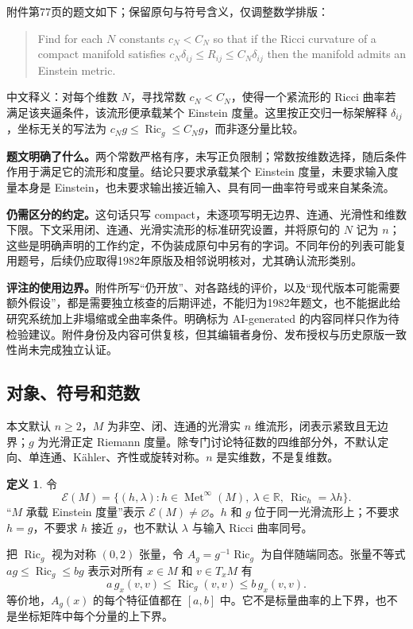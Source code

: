 \documentclass[11pt,a4paper]{article}
\theoremstyle{definition}
\newtheorem{definition}{定义}[section]
\newcommand{\Ric}{\operatorname{Ric}}
\newcommand{\Met}{\operatorname{Met}}
\newcommand{\Ein}{\mathcal E}
\begin{document}
附件第77页的题文如下；保留原句与符号含义，仅调整数学排版：
\begin{quote}
Find for each $N$ constants $c_N<C_N$ so that if the Ricci curvature of a compact manifold satisfies $c_N\delta_{ij}\le R_{ij}\le C_N\delta_{ij}$ then the manifold admits an Einstein metric.
\end{quote}
中文释义：对每个维数 $N$，寻找常数 $c_N<C_N$，使得一个紧流形的 Ricci 曲率若满足该夹逼条件，该流形便承载某个 Einstein 度量。这里按正交归一标架解释 $\delta_{ij}$，坐标无关的写法为 $c_Ng\le\Ric_g\le C_Ng$，而非逐分量比较。

\textbf{题文明确了什么。}两个常数严格有序，未写正负限制；常数按维数选择，随后条件作用于满足它的流形和度量。结论只要求承载某个 Einstein 度量，未要求输入度量本身是 Einstein，也未要求输出接近输入、具有同一曲率符号或来自某条流。

\textbf{仍需区分的约定。}这句话只写 compact，未逐项写明无边界、连通、光滑性和维数下限。下文采用闭、连通、光滑实流形的标准研究设置，并将原句的 $N$ 记为 $n$；这些是明确声明的工作约定，不伪装成原句中另有的字词。不同年份的列表可能复用题号，后续仍应取得1982年原版及相邻说明核对，尤其确认流形类别。

\textbf{评注的使用边界。}附件所写“仍开放”、对各路线的评价，以及“现代版本可能需要额外假设”，都是需要独立核查的后期评述，不能归为1982年题文，也不能据此给研究系统加上非塌缩或全曲率条件。明确标为 AI-generated 的内容同样只作为待检验建议。附件身份及内容可供复核，但其编辑者身份、发布授权与历史原版一致性尚未完成独立认证。

\subsection{对象、符号和范数}

本文默认 $n\ge2$，$M$ 为非空、闭、连通的光滑实 $n$ 维流形，闭表示紧致且无边界；$g$ 为光滑正定 Riemann 度量。除专门讨论特征数的四维部分外，不默认定向、单连通、Kähler、齐性或旋转对称。$n$ 是实维数，不是复维数。

\begin{definition}
令
\[
\Ein(M)=\{(h,\lambda):h\in\Met^\infty(M),\ \lambda\in\mathbb R,
\ \Ric_h=\lambda h\}.
\]
“$M$ 承载 Einstein 度量”表示 $\Ein(M)\ne\varnothing$。$h$ 和 $g$ 位于同一光滑流形上；不要求 $h=g$，不要求 $h$ 接近 $g$，也不默认 $\lambda$ 与输入 Ricci 曲率同号。
\end{definition}

把 $\Ric_g$ 视为对称 $(0,2)$ 张量，令 $A_g=g^{-1}\Ric_g$ 为自伴随端同态。张量不等式 $ag\le\Ric_g\le bg$ 表示对所有 $x\in M$ 和 $v\in T_xM$ 有
\[
a\,g_x(v,v)\le\Ric_g(v,v)\le b\,g_x(v,v).
\]
等价地，$A_g(x)$ 的每个特征值都在 $[a,b]$ 中。它不是标量曲率的上下界，也不是坐标矩阵中每个分量的上下界。
\end{document}
